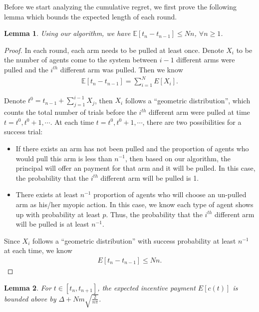 \documentclass{article}
\newtheorem{lemma}{Lemma}
\begin{document}
Before we start analyzing the cumulative regret, we first prove the following lemma which bounds the expected length of each round.

\begin{lemma}
Using our algorithm, we have $\mathbb{E}[t_{n}-t_{n-1}]\leq Nn$, $\forall n\geq 1$.
\label{round:length}
\end{lemma}


\begin{proof}
In each round, each arm needs to be pulled at least once. Denote $X_{i}$ to be the number of agents come to the system between $i-1$ different arms were pulled and the $i^{th}$ different arm was pulled. Then we know 
\begin{align}
\mathbb{E}[t_{n}-t_{n-1}]=\sum_{i=1}^{N}E[X_{i}]. \nonumber
\end{align}


Denote $t^{0}=t_{n-1}+\sum_{j=1}^{i-1}X_{j}$, then $X_{i}$ follows a ``geometric distribution'', which counts the total number of trials before the $i^{th}$ different arm were pulled at time $t=t^{0},t^{0}+1,\cdots$. At each time $t=t^{0}, t^{0}+1,\cdots$, there are two possibilities for a success trial:
\begin{itemize}
\item If there exists an arm has not been pulled and the proportion of agents who would pull this arm is less than $n^{-1}$, then based on our algorithm, the principal will offer an payment for that arm and it will be pulled. In this case, the probability that the $i^{th}$ different arm will be pulled is 1.  
\item There exists at least $n^{-1}$ proportion of agents who will choose an un-pulled arm as his/her myopic action. In this case, we know each type of agent shows up with probability at least $p$. Thus, the probability that the $i^{th}$ different arm will be pulled is at least $n^{-1}$.
\end{itemize}

Since $X_{i}$ follows a ``geometric distribution'' with success probability at least $n^{-1}$ at each time, we know 
\begin{align}
E[t_{n}-t_{n-1}]\leq Nn. \nonumber
\end{align}
\end{proof}

\begin{lemma}
For $t\in[t_n,t_{n+1}]$, the expected incentive payment $E[c(t)]$ is bounded above by $\Delta + Nm \sqrt{\frac{2}{n\pi}}$. 
\end{lemma}
\end{document}
